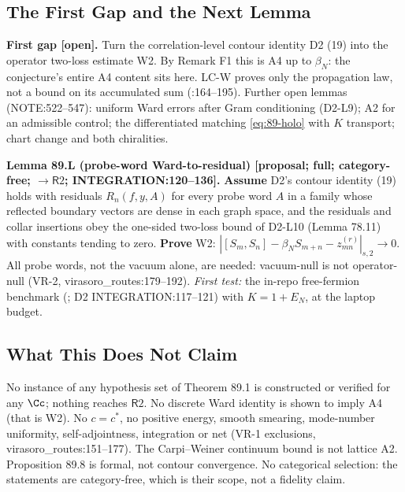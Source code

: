 \subsection{The First Gap and the Next Lemma}

\textbf{First gap [open].}  Turn the correlation-level contour identity D2 (19) into the operator two-loss estimate
W2.  By Remark F1 this is A4 up to \(\beta_N\): the conjecture's entire A4 content sits here.  LC-W proves only the
propagation law, not a bound on its accumulated sum (:164--195).  Further open
lemmas (NOTE:522--547): uniform Ward errors after Gram conditioning (D2-L9); A2 for an admissible control;
the differentiated matching \eqref{eq:89-holo} with \(K\) transport; chart change and both chiralities.

\textbf{Lemma 89.L (probe-word Ward-to-residual) [proposal; full; category-free; \(\to\mathsf R2\);
INTEGRATION:120--136].}  \textbf{Assume} D2's contour identity (19) holds with residuals \(R_n(f,y,A)\) for every
probe word \(A\) in a family whose reflected boundary vectors are dense in each graph space, and the residuals and
collar insertions obey the one-sided two-loss bound of D2-L10 (Lemma 78.11) with constants tending to zero.
\textbf{Prove} W2: \(|[S_m,S_n]-\beta_NS_{m+n}-z^{(r)}_{mn}|_{s,2}\to0\).  All probe words, not the vacuum alone, are
needed: vacuum-null is not operator-null (VR-2, virasoro\_routes:179--192).  \emph{First test:} the in-repo free-fermion benchmark
(; D2 INTEGRATION:117--121) with \(K=1+E_N\), at the laptop budget.

\subsection{What This Does Not Claim}

No instance of any hypothesis set of Theorem 89.1 is constructed or verified for any \(\Cc\); nothing reaches
\(\mathsf R2\).  No discrete Ward identity is shown to imply A4 (that is W2).  No \(c=c^*\), no positive energy, smooth
smearing, mode-number uniformity, self-adjointness, integration or net (VR-1 exclusions, virasoro\_routes:151--177).
The Carpi--Weiner continuum bound is not lattice A2.  Proposition 89.8 is formal, not contour convergence.  No
categorical selection: the statements are category-free, which is their scope, not a fidelity claim.

